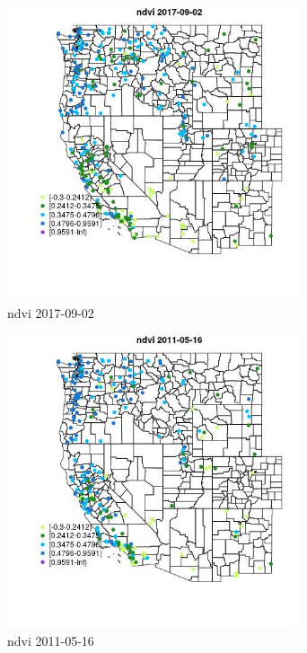 \begin{figure} 
\centering  
\includegraphics[width=0.77\textwidth]{Code_Outputs/Report_ML_input_PM25_Step4_part_e_de_duplicated_aves_compiled_2019-05-21wNAs_MapObsndvi2017-09-02.jpg} 
\caption{\label{fig:Report_ML_input_PM25_Step4_part_e_de_duplicated_aves_compiled_2019-05-21wNAsMapObsndvi2017-09-02}ndvi 2017-09-02} 
\end{figure} 
 

\begin{figure} 
\centering  
\includegraphics[width=0.77\textwidth]{Code_Outputs/Report_ML_input_PM25_Step4_part_e_de_duplicated_aves_compiled_2019-05-21wNAs_MapObsndvi2011-05-16.jpg} 
\caption{\label{fig:Report_ML_input_PM25_Step4_part_e_de_duplicated_aves_compiled_2019-05-21wNAsMapObsndvi2011-05-16}ndvi 2011-05-16} 
\end{figure} 
 

